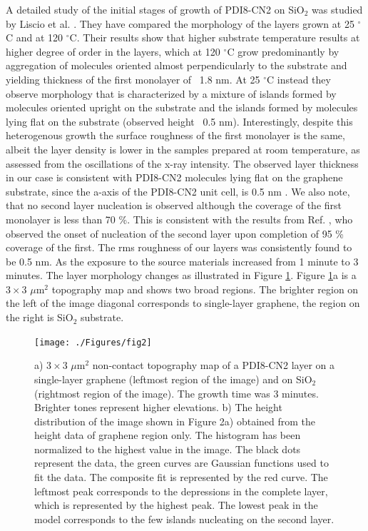 \documentclass[preprint,aip,jap]{revtex4-2}
\begin{document}
 
A detailed study of the initial stages of growth of PDI8-CN2 on SiO$_{2}$ was studied by Liscio et al.
\cite{liscio-2013}.
 They have compared the morphology of the layers grown at 25 $^\circ$C and at 120 $^\circ$C.
 Their results show that higher substrate temperature results at higher degree of order in the layers, which at 120 $^\circ$C grow predominantly by aggregation of molecules oriented almost perpendicularly to the substrate and yielding thickness of the first monolayer of ~1.8 nm.
 At 25 $^\circ$C instead they observe morphology that is characterized by a mixture of islands formed by molecules oriented upright on the substrate and the islands formed by molecules lying flat on the substrate (observed height ~0.5 nm).
 Interestingly, despite this heterogenous growth the surface roughness of the first monolayer is the same, albeit the layer density is lower in the samples prepared at room temperature, as assessed from the oscillations of the x-ray intensity.
The observed layer thickness in our case is consistent with PDI8-CN2 molecules lying flat on the graphene substrate, since the a-axis of the PDI8-CN2 unit cell, is 0.5 nm \cite{liscio-2012}.
 We also note, that no second layer nucleation is observed although the coverage of the first monolayer is less than 70 \%.
 This is consistent with the results from Ref.
 , who observed the onset of nucleation of the second layer upon completion of 95 \% coverage of the first.
 The rms roughness of our layers was consistently found to be 0.5 nm.
 As the exposure to the source materials increased from 1 minute to 3 minutes.
 The layer morphology changes as illustrated in Figure \ref{fig:2}.
 Figure \ref{fig:2}a is a $3\times3$ $\mu$m$^{2}$ topography map and shows two broad regions.
 The brighter region on the left of the image diagonal corresponds to single-layer graphene, the region on the right is SiO$_{2}$ substrate.
 
\begin{figure}[htb]
  \centering
   \texttt{[image: ./Figures/fig2]}
  \caption{a) $3\times3$ $\mu$m$^{2}$ non-contact topography map of a PDI8-CN2 layer on a single-layer graphene (leftmost region of the image) and on SiO$_{2}$ (rightmost region of the image).
 The growth time was 3 minutes.
 Brighter tones represent higher elevations.
 b) The height distribution of the image shown in Figure 2a) obtained from the height data of graphene region only.
 The histogram has been normalized to the highest value in the image.
 The black dots represent the data, the green curves are Gaussian functions used to fit the data.
 The composite fit is represented by the red curve.
  The leftmost peak corresponds to the depressions in the complete layer, which is represented by the highest peak.
 The lowest peak in the model corresponds to the few islands nucleating on the second layer.
}  \label{fig:2}
\end{figure}
\end{document}
